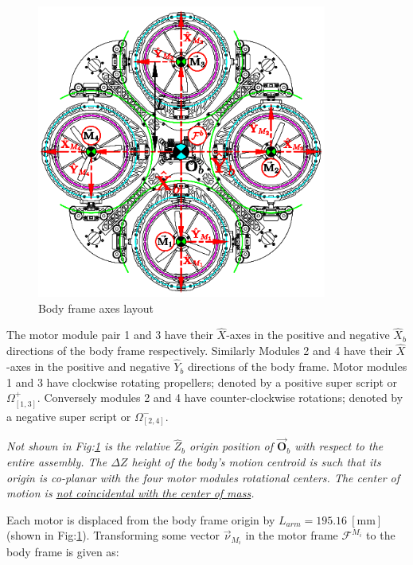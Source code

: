 \begin{figure}[htbp]
\vspace{-6pt}
\centering
\includegraphics[width=0.85\textwidth]{figs/body-frame}
\vspace{-4pt}
\caption{Body frame axes layout}
\label{fig:body-frame}
\vspace{-16pt}
\end{figure}
\par
The motor module pair 1 and 3 have their $\hat{X}$-axes in the positive and negative $\hat{X}_b$ directions of the body frame respectively. Similarly Modules 2 and 4 have their $\hat{X}$-axes in the positive and negative $\hat{Y}_b$ directions of the body frame. Motor modules 1 and 3 have clockwise rotating propellers; denoted by a positive super script or $\Omega_{[1,3]}^{+}$. Conversely modules 2 and 4 have counter-clockwise rotations; denoted by a negative super script or $\Omega_{[2,4]}^{-}$.
\par
\emph{\color{Gray}Not shown in Fig:\ref{fig:body-frame} is the relative $\hat{Z}_b$ origin position of $\vec{\mathbf{O}}_b$ with respect to the entire assembly. The $\Delta Z$ height of the body's motion centroid is such that its origin is co-planar with the four motor modules rotational centers. The center of motion is \underline{not coincidental with the center of mass}.}
\par
Each motor is displaced from the body frame origin by $L_{arm}=195.16~[\text{mm}]$ (shown in Fig:\ref{fig:body-frame}). Transforming some vector $\vec{\nu}_{M_i}$ in the motor frame $\mathcal{F}^{M_i}$ to the body frame is given as:
